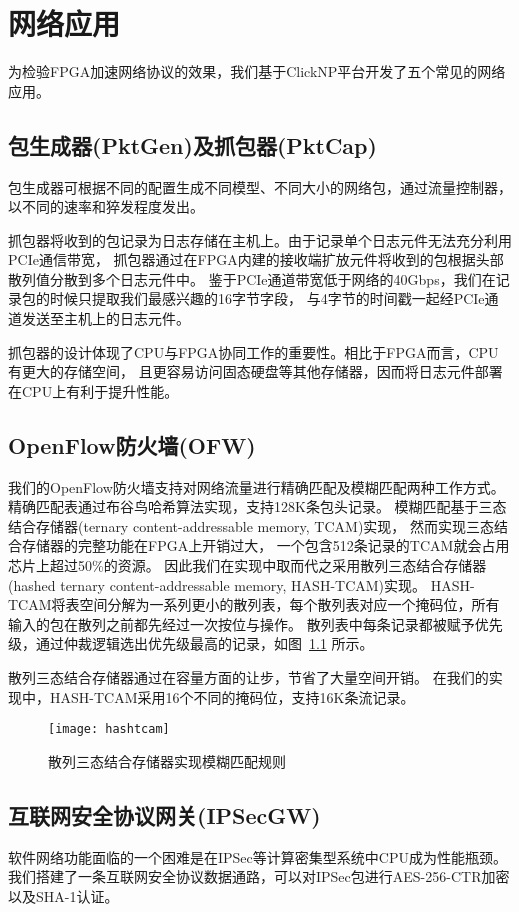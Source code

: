 \chapter{网络应用}
为检验FPGA加速网络协议的效果，我们基于ClickNP平台开发了五个常见的网络应用。

\section{包生成器(PktGen)及抓包器(PktCap)}
包生成器可根据不同的配置生成不同模型、不同大小的网络包，通过流量控制器，以不同的速率和猝发程度发出。

抓包器将收到的包记录为日志存储在主机上。由于记录单个日志元件无法充分利用PCIe通信带宽，
抓包器通过在FPGA内建的接收端扩放元件将收到的包根据头部散列值分散到多个日志元件中。
鉴于PCIe通道带宽低于网络的40Gbps，我们在记录包的时候只提取我们最感兴趣的16字节字段，
与4字节的时间戳一起经PCIe通道发送至主机上的日志元件。

抓包器的设计体现了CPU与FPGA协同工作的重要性。相比于FPGA而言，CPU有更大的存储空间，
且更容易访问固态硬盘等其他存储器，因而将日志元件部署在CPU上有利于提升性能。

\section{OpenFlow防火墙(OFW)}
我们的OpenFlow防火墙支持对网络流量进行精确匹配及模糊匹配两种工作方式。
精确匹配表通过布谷鸟哈希算法实现，支持128K条包头记录。
模糊匹配基于三态结合存储器(ternary content-addressable memory, TCAM)实现，
然而实现三态结合存储器的完整功能在FPGA上开销过大，
一个包含512条记录的TCAM就会占用芯片上超过50\%的资源。
因此我们在实现中取而代之采用散列三态结合存储器(hashed ternary content-addressable memory, HASH-TCAM)实现。
HASH-TCAM将表空间分解为一系列更小的散列表，每个散列表对应一个掩码位，所有输入的包在散列之前都先经过一次按位与操作。
散列表中每条记录都被赋予优先级，通过仲裁逻辑选出优先级最高的记录，如图~\ref{fig:hashtcam} 所示。

散列三态结合存储器通过在容量方面的让步，节省了大量空间开销。
在我们的实现中，HASH-TCAM采用16个不同的掩码位，支持16K条流记录。
\begin{figure}[ht]
\centering
\texttt{[image: hashtcam]}
\caption{散列三态结合存储器实现模糊匹配规则} \label{fig:hashtcam}
\end{figure}

\section{互联网安全协议网关(IPSecGW)}
软件网络功能面临的一个困难是在IPSec等计算密集型系统中CPU成为性能瓶颈。
我们搭建了一条互联网安全协议数据通路，可以对IPSec包进行AES-256-CTR加密以及SHA-1认证。

